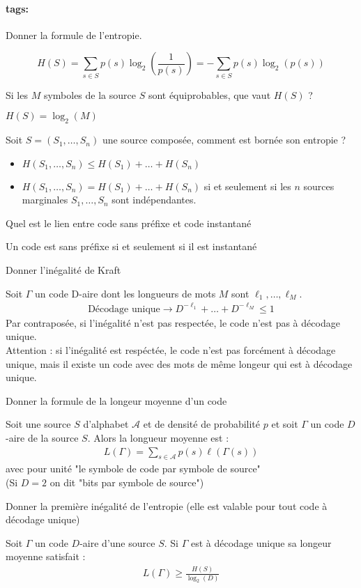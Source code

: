 \documentclass[12pt]{article}
\newcommand*{\xfield}[1]{\begin{mdframed}\centering #1\end{mdframed}\bigskip}
\newenvironment{note}{}{}
\newcommand*{\tags}[1]{\paragraph{tags: }#1}
\begin{document}
\begin{note}
	\tags{}
	\xfield{
		Donner la formule de l'entropie.	
	}
	\xfield{
		$$H(S) = \sum\limits_{s \in S} p(s)\log_2\left(\frac{1}{p(s)}\right) = -\sum\limits_{s \in S} p(s)\log_2(p(s))$$	
	}
\end{note}

\begin{note}
	\xfield{Si les $M$ symboles de la source $S$ sont équiprobables, que vaut $H(S)$ ?}
	\xfield{$H(S) = \log_2(M)$}
\end{note}

\begin{note}
	\xfield{Soit $S=(S_1,\hdots,S_n)$ une source composée, comment est bornée son entropie ?}
	\xfield{\begin{itemize}
	\item $H(S_1,\hdots,S_n) \le H(S_1) + \hdots + H(S_n)$
	\item $H(S_1,\hdots,S_n) = H(S_1) + \hdots + H(S_n)$ si et seulement si les $n$ sources marginales $S_1,\hdots,S_n$ sont indépendantes.
	\end{itemize}}
\end{note}

\begin{note}
	\xfield{Quel est le lien entre code sans préfixe et code instantané}
	\xfield{Un code est sans préfixe si et seulement si il est instantané}
\end{note}
\begin{note}
	\xfield{Donner l'inégalité de Kraft}
	\xfield{Soit $\Gamma$ un code D-aire dont les longueurs de mots $M$ sont $\ell_1,\hdots,\ell_M$.\begin{align*}
	\text{Décodage unique} \rightarrow D^{-\ell_1}+ \hdots + D^{-\ell_M} \le 1
	\end{align*}
	Par contraposée, si l'inégalité n'est pas respectée, le code n'est pas à décodage unique.\\
	Attention : si l'inégalité est respéctée, le code n'est pas forcément à décodage unique, mais il existe un code avec des mots de même longeur qui est à décodage unique.}
\end{note}
\begin{note}
	\xfield{Donner la formule de la longeur moyenne d'un code}
	\xfield{Soit une source $S$ d'alphabet $\mathcal{A}$ et de densité de probabilité $p$ et soit $\Gamma$ un code $D$-aire de la source $S$. Alors la longueur moyenne est :
	\begin{align*}
	L(\Gamma) = \sum\limits_{s \in \mathcal{A}} p(s)\ell(\Gamma(s))
	\end{align*}
	avec pour unité "le symbole de code par symbole de source"\\
	 (Si $D=2$ on dit "bits par symbole de source")}
\end{note}
\begin{note}
\xfield{Donner la première inégalité de l'entropie (elle est valable pour tout code à décodage unique)}
\xfield{Soit $\Gamma$ un code $D$-aire d'une source $S$. Si $\Gamma$ est à décodage unique sa longeur moyenne satisfait : \begin{align*}
L(\Gamma) \ge \frac{H(S)}{\log_2(D)}
\end{align*}}
\end{note}
\end{document}
